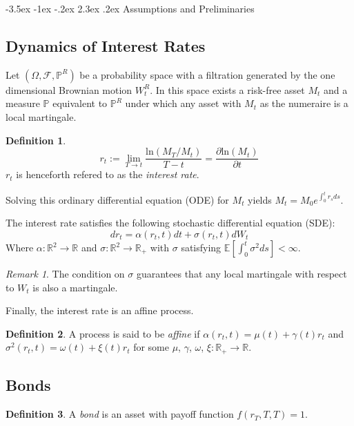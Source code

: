 \documentclass[12pt]{article}
\makeatletter
\renewcommand\section{\@startsection{section}{1}{\z@}%
                                  {-3.5ex \@plus -1ex \@minus -.2ex}%
                                  {2.3ex \@plus.2ex}%
                                  {\normalfont\large\bfseries}}
\theoremstyle{definition}
\newtheorem{mydef}{Definition}
\theoremstyle{remark}
\newtheorem{rem}{Remark}
\makeatother
\begin{document}
\section{Assumptions and Preliminaries}
\subsection{Dynamics of Interest Rates}
Let \((\Omega, \mathcal{F}, \mathbb{P}^{R})\) be a probability space with a filtration generated by the one dimensional Brownian motion \(W_t^{R}\).  In this space exists a risk-free asset \(M_t\) and a measure \(\mathbb{P}\) equivalent to \(\mathbb{P}^{R}\) under which any asset with \(M_t\) as the numeraire  is a local martingale.  
\begin{mydef}
\[r_t:=\lim_{T \to t} \frac{\mathrm{ln} \left(M_T/M_t\right)}{T-t}=\frac{\partial \mathrm{ln}(M_t)}{\partial t}\]
\(r_t\) is henceforth refered to as the \emph{interest rate}.
\end{mydef}
Solving this ordinary differential equation (ODE) for \(M_t\) yields \(M_t=M_0 e^{\int_0 ^t r_s ds}\).

The interest rate satisfies the following stochastic differential equation (SDE):
\[dr_t=\alpha(r_t, t)dt+\sigma(r_t, t)dW_t\]
Where \(\alpha : \mathbb{R}^2 \to \mathbb{R}\) and \(\sigma: \mathbb{R}^2 \to \mathbb{R}_{+} \) with \(\sigma\) satisfying \(\mathbb{E}\left[ \int_ 0 ^t \sigma^2 ds \right] < \infty\). 
\begin{rem}
The condition on \(\sigma\) guarantees that any local martingale with respect to \(W_t\) is also a martingale.
\end{rem}
Finally, the interest rate is an affine process.
\begin{mydef}
A process is said to be \emph{affine} if \(\alpha(r_t, t)=\mu(t)+\gamma(t) r_t\) and \(\sigma^2(r_t, t)=\omega(t)+\xi(t) r_t\) for some \(\mu \), \( \gamma \), \(\omega \), \(\xi : \mathbb{R}_{+} \to \mathbb{R}\).
\label{Definition:def1}
\end{mydef}
\subsection{Bonds}
\begin{mydef}
A \emph{bond} is an asset with payoff function \(f(r_T, T, T)=1\).
\end{mydef}
\end{document}
